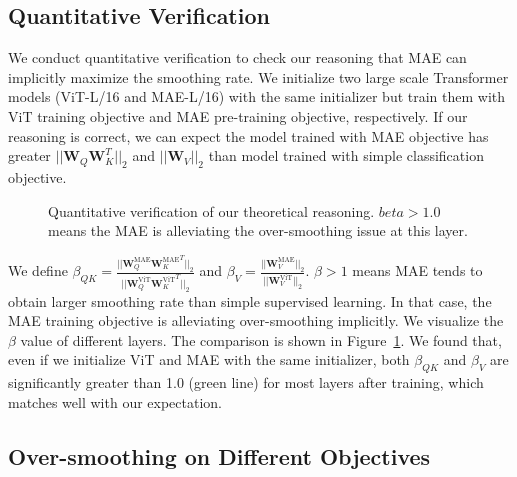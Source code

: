 \documentclass{article}
\theoremstyle{plain}
\theoremstyle{definition}
\theoremstyle{remark}
\begin{document}
\subsection{Quantitative Verification}\label{sec: quantitative verification}

We conduct quantitative verification to check our reasoning that MAE can implicitly maximize the smoothing rate. We initialize two large scale Transformer models (ViT-L/16 and MAE-L/16) with the same initializer but train them with ViT training objective and MAE pre-training objective, respectively. If our reasoning is correct, we can expect the model trained with MAE objective has greater $||\mathbf{W}_Q \mathbf{W}_K^T||_2$ and $||\mathbf{W}_V||_2$ than model trained with simple classification objective.

\begin{figure}[t]
\centering
{}\vspace{-0.4cm}
\vspace{-0.35cm}
\caption{Quantitative verification of our theoretical reasoning. $beta>1.0$ means the MAE is alleviating the over-smoothing issue at this layer.}
\vspace{-0.4cm}
\label{fig: beta}
\end{figure}

We define $\beta_{QK}=\frac{||\mathbf{W}^\mathrm{MAE}_Q {\mathbf{W}^\mathrm{MAE}_K}^T||_2}{||\mathbf{W}^\mathrm{ViT}_Q {\mathbf{W}^\mathrm{ViT}_K}^T||_2}$ and $\beta_{V}=\frac{||\mathbf{W}^\mathrm{MAE}_V||_2}{||\mathbf{W}^\mathrm{ViT}_V ||_2}$. 
$\beta>1$ means MAE tends to obtain larger smoothing rate than simple supervised learning. In that case, the MAE training objective is alleviating over-smoothing implicitly.
We visualize the $\beta$ value of different layers. The comparison is shown in Figure~\ref{fig: beta}. We found that, even if we initialize ViT and MAE with the same initializer, both $\beta_{QK}$ and $\beta_{V}$ are significantly greater than 1.0 (green line) for most layers after training, which matches well with our expectation.


\subsection{Over-smoothing on Different Objectives}
\end{document}
